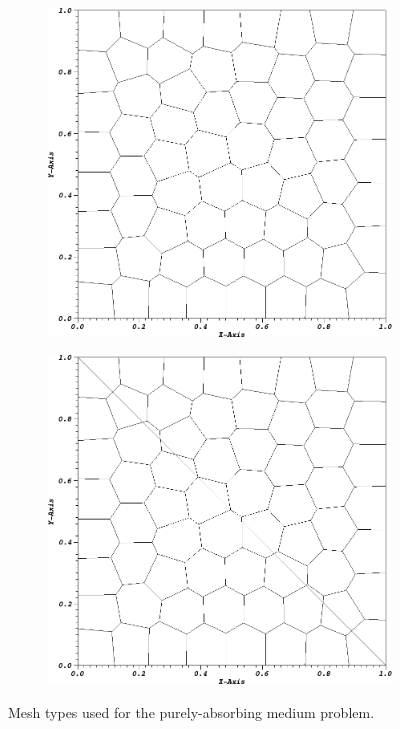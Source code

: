 \begin{figure}
{\begin{subfigure}[b]{0.485\textwidth}
	\end{subfigure}
}
\vspace{1cm}
{
	\begin{subfigure}[b]{0.485\textwidth}
		\centering
		\label{subfig::PA_Mesh_Poly}
		\includegraphics[width=\textwidth]{figures/sec_BF/PAMesh_Poly.png}
	\end{subfigure}
	\hfill
	\begin{subfigure}[b]{0.485\textwidth}
		\centering
		\label{subfig::PA_Mesh_SplitPoly}
		\includegraphics[width=\textwidth]{figures/sec_BF/PAMesh_SplitPoly.png}
	\end{subfigure}
}
\caption{Mesh types used for the purely-absorbing medium problem.}
\label{fig::BF_Results_PA_Meshes}
\end{figure}


